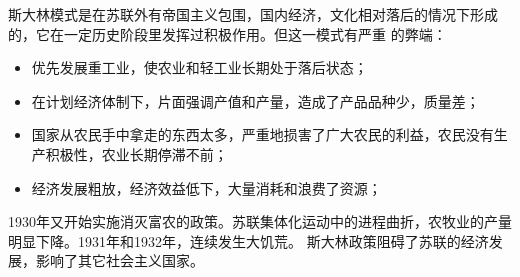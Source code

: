 斯大林模式是在苏联外有帝国主义包围，国内经济，文化相对落后的情况下形成的，它在一定历史阶段里发挥过积极作用。但这一模式有严重 的弊端：

\begin{itemize}
    \item 优先发展重工业，使农业和轻工业长期处于落后状态；
    \item 在计划经济体制下，片面强调产值和产量，造成了产品品种少，质量差；
    \item 国家从农民手中拿走的东西太多，严重地损害了广大农民的利益，农民没有生产积极性，农业长期停滞不前；
    \item 经济发展粗放，经济效益低下，大量消耗和浪费了资源；
\end{itemize}

1930年又开始实施消灭富农的政策。苏联集体化运动中的进程曲折，农牧业的产量明显下降。1931年和1932年，连续发生大饥荒。
斯大林政策阻碍了苏联的经济发展，影响了其它社会主义国家。






